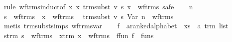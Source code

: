 \begin{isabellebody}
%
\isadelimproof
%
\endisadelimproof
%
\isatagproof
{}\isamarkupfalse%
\ {}rule\ wf{}trms{}induct{}of\ x\ {}{}x{}\ trm{}subst\ v\ s\ x\ {}\ wf{}trms{}{}{}\ safe{}\isanewline
\ \ \isamarkupfalse%
\ n\ \isamarkupfalse%
\ {}s\ {}\ wf{}trms{}\ \ {}x\ {}\ wf{}trms{}\ \isamarkupfalse%
\ {}trm{}subst\ v\ s\ {}Var\ n{}\ {}\ wf{}trms{}\isanewline
\ \ \ \ \isamarkupfalse%
\ {}metis\ trm{}subst{}simps{}{}{}\ wf{}trms{}var{}\isanewline
{}\isamarkupfalse%
\isanewline
\ \ \isamarkupfalse%
\ f\ {}{}\ {}{}a{}{}ranked{}alphabet{}\ \ xs\ {}{}\ {}{}a\ trm\ list{}\isanewline
\ \ \isamarkupfalse%
\ s{}trm{}\ {}s\ {}\ wf{}trms{}\ \ x{}trm{}\ {}x\ {}\ wf{}trms{}\ \ f{}fun{}\ {}f\ {}\ funs{}\isanewline

\end{isabellebody}
